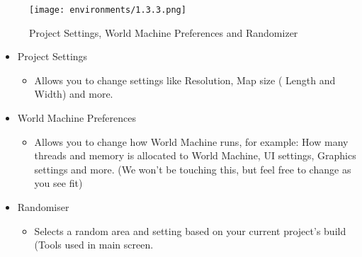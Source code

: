 \documentclass[../main.tex]{subfiles}
\begin{document}
\begin{figure}[H]
\texttt{[image: environments/1.3.3.png]}
\caption{Project Settings, World Machine Preferences and Randomizer}
\end{figure}
\begin{itemize}
    \item Project Settings
    \begin{itemize}
        \item Allows you to change settings like Resolution, Map size ( Length and Width) and more.
    \end{itemize}
    \item World Machine Preferences
    \begin{itemize}
        \item Allows you to change how World Machine runs, for example: How many threads and memory is allocated to World Machine, UI settings, Graphics settings and more. (We won’t be touching this, but feel free to change as you see fit)
    \end{itemize}
    \item {Randomiser}
    \begin{itemize}
        \item Selects a random area and setting based on your current project’s build (Tools used in main screen.
    \end{itemize}
\end{itemize}
\end{document}
